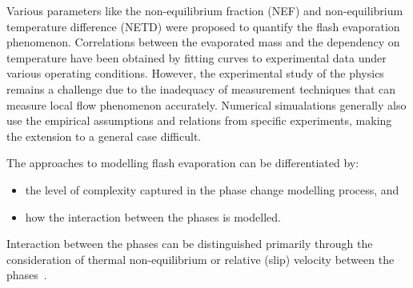 Various parameters like the non-equilibrium fraction (NEF) and non-equilibrium temperature difference (NETD) were proposed to 
 quantify the flash evaporation phenomenon. Correlations between the evaporated mass and the dependency on temperature 
 have been obtained by fitting curves to experimental data under various operating conditions. However,
 the experimental study of the physics remains a challenge due to the inadequacy of measurement techniques that
 can measure local flow phenomenon accurately. Numerical simualations generally also use the empirical assumptions 
 and relations from specific experiments, making the extension to a general case difficult.~\cite{haoMathematicalStudyBubble2019}

The approaches to modelling flash evaporation can be differentiated by:
\begin{itemize}
  \item the level of complexity captured in the phase change modelling process, and
  \item how the interaction between the phases is modelled.
\end{itemize}
Interaction between the phases can be distinguished primarily through the consideration of thermal non-equilibrium or
 relative (slip) velocity between the phases~\cite{liaoComputationalModellingFlash2017}. 
